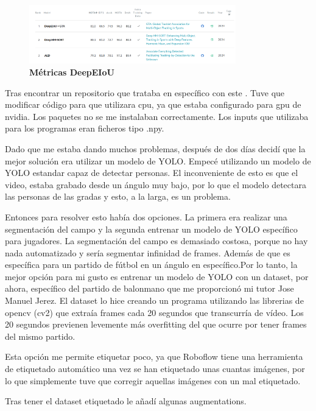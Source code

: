 \documentclass[12pt, a4paper, twoside]{article}
\begin{document}
	\begin{figure}[h]
		\centering
		\includegraphics[width=0.8\textwidth]{image/deepEIoU}
		\caption{\textbf{Métricas DeepEIoU}}
		\label{fig:deepEIoU}
	\end{figure} 
	
	Tras encontrar un repositorio que trataba en específico con este \cite{huang2024iterative}. Tuve que modificar código para que utilizara cpu, ya que estaba configurado para gpu de nvidia. Los paquetes no se me instalaban correctamente. Los inputs que utilizaba para los programas eran ficheros tipo .npy.
	
	Dado que me estaba dando muchos problemas, después de dos días decidí que la mejor solución era utilizar un modelo de YOLO. Empecé utilizando un modelo de YOLO estandar capaz de detectar personas. El inconveniente de esto es que el video, estaba grabado desde un ángulo muy bajo, por lo que el modelo detectara las personas de las gradas y esto, a la larga, es un problema. 
	
	Entonces para resolver esto había dos opciones. La primera era realizar una segmentación del campo y la segunda entrenar un modelo de YOLO específico para jugadores. La segmentación del campo es demasiado costosa, porque no hay nada automatizado y sería segmentar infinidad de frames. Además de que es específica para un partido de fútbol en un ángulo en específico.Por lo tanto, la mejor opción para mi gusto es entrenar un modelo de YOLO con un dataset, por ahora, específico del partido de balonmano que me proporcionó mi tutor Jose Manuel Jerez. El dataset lo hice creando un programa utilizando las librerias de opencv (cv2) que extraía frames cada 20 segundos que transcurría de vídeo. Los 20 segundos previenen levemente más overfitting del que ocurre por tener frames del mismo partido. 
	
	Esta opción me permite etiquetar poco, ya que Roboflow tiene una herramienta de etiquetado automático una vez se han etiquetado unas cuantas imágenes, por lo que simplemente tuve que corregir aquellas imágenes con un mal etiquetado.
	
	Tras tener el dataset etiquetado le añadí algunas augmentations. 
	
\end{document}
